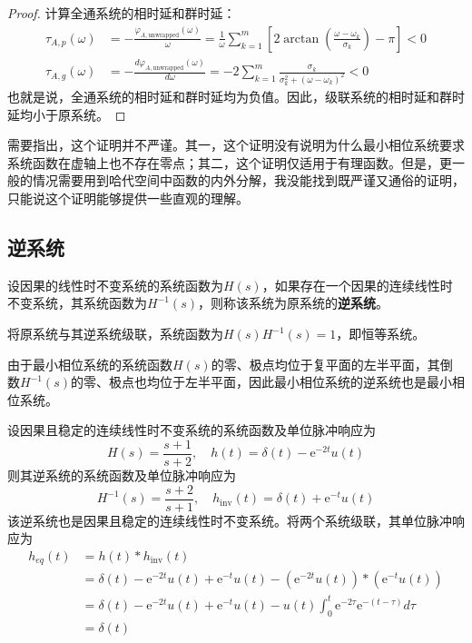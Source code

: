\begin{proof}
    计算全通系统的相时延和群时延：
    \begin{align*}
        \tau_{A,p}(\omega)&=-\frac{\varphi_{A,\mathrm{unwrapped}}(\omega)}{\omega}=\frac{1}{\omega}\sum_{k=1}^m \left[2\arctan\left(\frac{\omega-\omega_k}{\sigma_k}\right)-\pi\right]<0\\
        \tau_{A,g}(\omega)&=-\frac{d\varphi_{A,\mathrm{unwrapped}}(\omega)}{d\omega}=-2\sum_{k=1}^m \frac{\sigma_k}{\sigma_k^2+(\omega-\omega_k)^2}<0
    \end{align*}
    也就是说，全通系统的相时延和群时延均为负值。因此，级联系统的相时延和群时延均小于原系统。
\end{proof}

需要指出，这个证明并不严谨。其一，这个证明没有说明为什么最小相位系统要求系统函数在虚轴上也不存在零点；其二，这个证明仅适用于有理函数。但是，更一般的情况需要用到哈代空间中函数的内外分解，我没能找到既严谨又通俗的证明，只能说这个证明能够提供一些直观的理解。

\subsection{逆系统}\label{sub:inv_system}

\begin{definition}[逆系统]
    设因果的线性时不变系统的系统函数为$H(s)$，如果存在一个因果的连续线性时不变系统，其系统函数为$H^{-1}(s)$，则称该系统为原系统的\textbf{逆系统}。
\end{definition}

将原系统与其逆系统级联，系统函数为$H(s)H^{-1}(s)=1$，即恒等系统。

由于最小相位系统的系统函数$H(s)$的零、极点均位于复平面的左半平面，其倒数$H^{-1}(s)$的零、极点也均位于左半平面，因此最小相位系统的逆系统也是最小相位系统。

\begin{example}
    设因果且稳定的连续线性时不变系统的系统函数及单位脉冲响应为
    \[H(s)=\frac{s+1}{s+2},\quad h(t)=\delta(t)-\mathrm{e}^{-2t}u(t)\]
    则其逆系统的系统函数及单位脉冲响应为
    \[H^{-1}(s)=\frac{s+2}{s+1},\quad h_{\mathrm{inv}}(t)=\delta(t)+\mathrm{e}^{-t}u(t)\]
    该逆系统也是因果且稳定的连续线性时不变系统。将两个系统级联，其单位脉冲响应为
\begin{align*}
    h_{eq}(t)&=h(t)*h_{\mathrm{inv}}(t)\\
    &=\delta(t)-\mathrm{e}^{-2t}u(t)+\mathrm{e}^{-t}u(t)-(\mathrm{e}^{-2t}u(t))*(\mathrm{e}^{-t}u(t))\\
    &=\delta(t)-\mathrm{e}^{-2t}u(t)+\mathrm{e}^{-t}u(t)-u(t)\int_0^t \mathrm{e}^{-2\tau}\mathrm{e}^{-(t-\tau)}d\tau\\
    &=\delta(t)
\end{align*}
\end{example}

